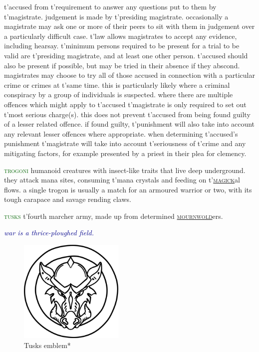 \documentclass[twoside,11pt,b5paper,twocolumn]{scrbook}
\newcommand{\estcab}[1]{\textsc{\textcolor{marron}{#1}}}
\newcommand{\keyword}[1]{\textcolor{darkgreen}{#1}}
\renewcommand{\paragraph}[1]{\par\noindent\markboth{#1}{#1}\estcab{\keyword{#1}}\label{#1} }
\newcommand{\see}[1]{{\estcab{\hyperref[#1]{#1}}}}
\newcommand{\proverb}[1]{\par \textcolor{darkblue}{\itshape #1}}
\begin{document}
t'accused from t'requirement to answer any questions put to them by t'magistrate. judgement is made by t'presiding magistrate. occasionally a magistrate may ask one or more of their peers to sit with them in judgement over a particularly difficult case. t'law allows magistrates to accept any evidence, including hearsay. t'minimum persons required to be present for a trial to be valid are t'presiding magistrate, and at least one other person. t'accused should also be present if possible, but may be tried in their absence if they abscond. magistrates may choose to try all of those accused in connection with a particular crime or crimes at t'same time. this is particularly likely where a criminal conspiracy by a group of individuals is suspected. where there are multiple offences which might apply to t'accused t'magistrate is only required to set out t'most serious charge(s). this does not prevent t'accused from being found guilty of a lesser related offence. if found guilty, t'punishment will also take into account any relevant lesser offences where appropriate. when determining t'accused's punishment t'magistrate will take into account t'seriousness of t'crime and any mitigating factors, for example presented by a priest in their plea for clemency.
\paragraph{trogoni} humanoid creatures with insect-like traits that live deep underground. they attack mana sites, consuming t'mana crystals and feeding on t'\see{magick}al flows. a single trogon is usually a match for an armoured warrior or two, with its tough carapace and savage rending claws.
\paragraph{tusks} t'fourth marcher army, made up from determined \see{mournwold}ers. \proverb{war is a thrice-ploughed field.} \begin{figure}\centering\includegraphics[width=5cm]{encyclopedia/Tusks}\caption{Tusks emblem*}\end{figure}
\end{document}
